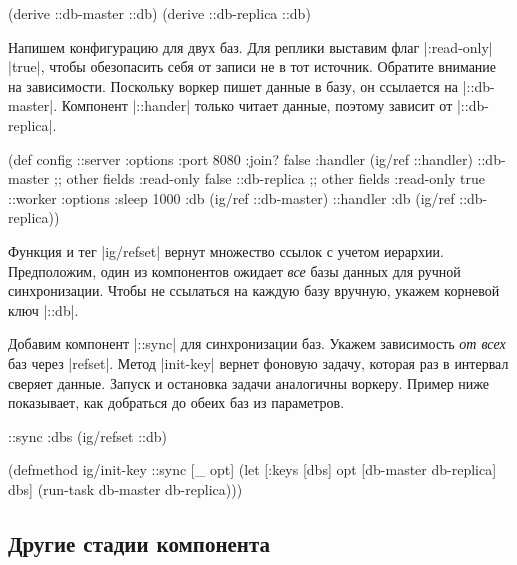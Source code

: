 \begin{english}
  \begin{clojure}
(derive ::db-master ::db)
(derive ::db-replica ::db)
  \end{clojure}
\end{english}

Напишем конфигурацию для двух баз. Для реплики выставим флаг \spverb|:read-only|
\spverb|true|, чтобы обезопасить себя от записи не в тот источник. Обратите
внимание на зависимости. Поскольку воркер пишет данные в базу, он ссылается на
\spverb|::db-master|. Компонент \spverb|::hander| только читает данные, поэтому
зависит от \spverb|::db-replica|.

\begin{english}
  \begin{clojure}
(def config
  {::server {:options {:port 8080 :join? false}
             :handler (ig/ref ::handler)}
   ::db-master {;; other fields
                :read-only false}
   ::db-replica {;; other fields
                 :read-only true}
   ::worker {:options {:sleep 1000}
             :db (ig/ref ::db-master)}
   ::handler {:db (ig/ref ::db-replica)}})
  \end{clojure}
\end{english}

Функция и тег \spverb|ig/refset| вернут множество ссылок с учетом
иерархии. Предположим, один из компонентов ожидает \emph{все} базы данных для
ручной синхронизации. Чтобы не ссылаться на каждую базу вручную, укажем корневой
ключ \spverb|::db|.

Добавим компонент \spverb|::sync| для синхронизации баз. Укажем зависимость
\emph{от всех} баз через \spverb|refset|. Метод \spverb|init-key| вернет фоновую
задачу, которая раз в интервал сверяет данные. Запуск и остановка задачи
аналогичны воркеру. Пример ниже показывает, как добраться до обеих баз из
параметров.

\begin{english}
  \begin{clojure}
{::sync {:dbs (ig/refset ::db)}}

(defmethod ig/init-key ::sync
  [_ opt]
  (let [{:keys [dbs]} opt
        [db-master db-replica] dbs]
    (run-task db-master db-replica)))
  \end{clojure}
\end{english}

\subsection{Другие стадии компонента}

